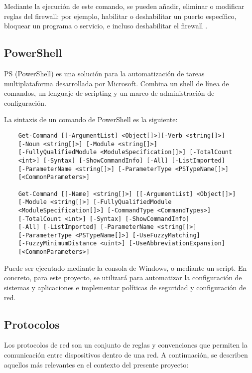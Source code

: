 Mediante la ejecución de este comando, se pueden añadir, eliminar o modificar reglas del firewall: por ejemplo,
habilitar o deshabilitar un puerto específico, bloquear un programa o servicio, e incluso deshabilitar el firewall
\cite{microsoftFirewallCLI}.

\subsection{PowerShell}\label{subsec:powershell}

PS (PowerShell)\cite{microsoftPowerShellOverview} es una solución para la automatización de tareas multiplataforma
desarrollada por Microsoft.
Combina un shell de línea de comandos, un lenguaje de scripting y un marco de administración de configuración.

La sintaxis de un comando de PowerShell es la siguiente:

\begin{verbatim}
	Get-Command [[-ArgumentList] <Object[]>][-Verb <string[]>]
	[-Noun <string[]>] [-Module <string[]>]
	[-FullyQualifiedModule <ModuleSpecification[]>] [-TotalCount
	<int>] [-Syntax] [-ShowCommandInfo] [-All] [-ListImported]
	[-ParameterName <string[]>] [-ParameterType <PSTypeName[]>]
	[<CommonParameters>]

	Get-Command [[-Name] <string[]>] [[-ArgumentList] <Object[]>]
	[-Module <string[]>] [-FullyQualifiedModule
	<ModuleSpecification[]>] [-CommandType <CommandTypes>]
	[-TotalCount <int>] [-Syntax] [-ShowCommandInfo]
	[-All] [-ListImported] [-ParameterName <string[]>]
	[-ParameterType <PSTypeName[]>] [-UseFuzzyMatching]
	[-FuzzyMinimumDistance <uint>] [-UseAbbreviationExpansion]
	[<CommonParameters>]
\end{verbatim}

Puede ser ejecutado mediante la consola de Windows, o mediante un script.
En concreto, para este proyecto, se utilizará para automatizar la configuración de sistemas y aplicaciones e
implementar políticas de seguridad y configuración de red.

\subsection{Protocolos}\label{subsec:protocolos}

Los protocolos de red son un conjunto de reglas y convenciones que permiten la comunicación entre dispositivos dentro
de una red.
A continuación, se describen aquellos más relevantes en el contexto del presente proyecto:

